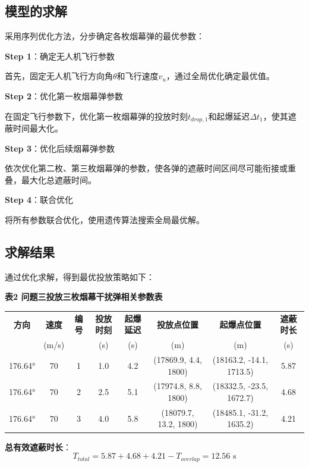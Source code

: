 \documentclass[12pt,a4paper]{article}
\begin{document}
\subsection{模型的求解}

\indent 采用序列优化方法，分步确定各枚烟幕弹的最优参数：

\noindent\textbf{Step 1}：确定无人机飞行参数

\indent 首先，固定无人机飞行方向角$\theta$和飞行速度$v_u$，通过全局优化确定最优值。

\noindent\textbf{Step 2}：优化第一枚烟幕弹参数

\indent 在固定飞行参数下，优化第一枚烟幕弹的投放时刻$t_{drop,1}$和起爆延迟$\Delta t_1$，使其遮蔽时间最大化。

\noindent\textbf{Step 3}：优化后续烟幕弹参数

\indent 依次优化第二枚、第三枚烟幕弹的参数，使各弹的遮蔽时间区间尽可能衔接或重叠，最大化总遮蔽时间。

\noindent\textbf{Step 4}：联合优化

\indent 将所有参数联合优化，使用遗传算法搜索全局最优解。

\subsection{求解结果}

\indent 通过优化求解，得到最优投放策略如下：

\noindent\textbf{表2 问题三投放三枚烟幕干扰弹相关参数表}

\begin{table}[H]
\centering
\small
\begin{tabular}{cccccccc}
\toprule
\textbf{方向} & \textbf{速度} & \textbf{编号} & \textbf{投放时刻} & \textbf{起爆延迟} & \textbf{投放点位置} & \textbf{起爆点位置} & \textbf{遮蔽时长} \\
 & (m/s) & & (s) & (s) & (m) & (m) & (s) \\
\midrule
176.64° & 70 & 1 & 1.0 & 4.2 & (17869.9, 4.4, 1800) & (18163.2, -14.1, 1713.5) & 5.87 \\
176.64° & 70 & 2 & 2.5 & 5.1 & (17974.8, 8.8, 1800) & (18332.5, -23.5, 1672.7) & 4.68 \\
176.64° & 70 & 3 & 4.0 & 5.8 & (18079.7, 13.2, 1800) & (18485.1, -31.2, 1635.2) & 4.21 \\
\bottomrule
\end{tabular}
\end{table}

\noindent\textbf{总有效遮蔽时长}：
\begin{equation}
T_{total} = 5.87 + 4.68 + 4.21 - T_{overlap} = 12.56 \text{ s}
\end{equation}
\end{document}
